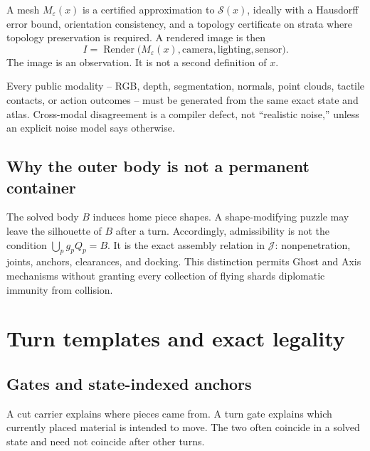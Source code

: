\documentclass[11pt,openany]{book}
\theoremstyle{polyplain}
\theoremstyle{polydef}
\begin{document}
A mesh $M_\varepsilon(x)$ is a certified approximation to $\mathcal S(x)$, ideally with a Hausdorff error bound, orientation consistency, and a topology certificate on strata where topology preservation is required. A rendered image is then
\[
I=\operatorname{Render}\bigl(M_\varepsilon(x),\text{camera},\text{lighting},\text{sensor}\bigr).
\]
The image is an observation. It is not a second definition of $x$.

\begin{designrule}
Every public modality -- RGB, depth, segmentation, normals, point clouds, tactile contacts, or action outcomes -- must be generated from the same exact state and atlas. Cross-modal disagreement is a compiler defect, not ``realistic noise,'' unless an explicit noise model says otherwise.
\end{designrule}

\section{Why the outer body is not a permanent container}

The solved body $B$ induces home piece shapes. A shape-modifying puzzle may leave the silhouette of $B$ after a turn. Accordingly, admissibility is not the condition $\bigcup_pg_pQ_p=B$. It is the exact assembly relation in $\mathcal J$: nonpenetration, joints, anchors, clearances, and docking. This distinction permits Ghost and Axis mechanisms without granting every collection of flying shards diplomatic immunity from collision.

\chapter{Turn templates and exact legality}
\label{chap:legality}

\section{Gates and state-indexed anchors}

A cut carrier explains where pieces came from. A turn gate explains which currently placed material is intended to move. The two often coincide in a solved state and need not coincide after other turns.
\end{document}
